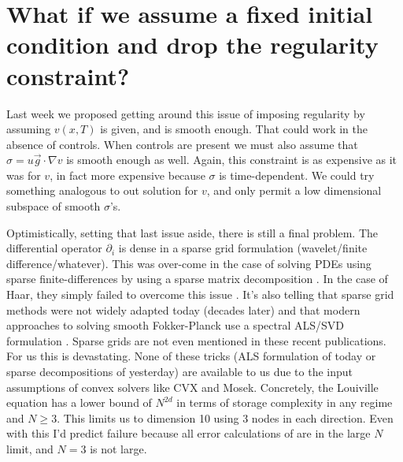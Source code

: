 \documentclass[12pt]{amsart}
\begin{document}
\section{What if we assume a fixed initial condition and drop the regularity constraint?}
Last week we proposed getting around this issue of imposing regularity by assuming $v(x,T)$ is given, and is smooth enough.
That could work in the absence of controls.
When controls are present we must also assume that $\sigma = u \vec{g} \cdot \nabla v$ is smooth enough as well.
Again, this constraint is as expensive as it was for $v$, in fact more expensive because $\sigma$ is time-dependent.
We could try something analogous to out solution for $v$, and only permit a low dimensional subspace of smooth $\sigma$'s.

Optimistically, setting that last issue aside, there is still a final problem.
The differential operator $\partial_i$ is dense in a sparse grid formulation (wavelet/finite difference/whatever).
This was over-come in the case of solving PDEs using sparse finite-differences by using a sparse matrix decomposition \cite[see page 4]{schiekofer1998software}.
In the case of Haar, they simply failed to overcome this issue \cite{koltai2011thesis}.
It's also telling that sparse grid methods were not widely adapted today (decades later) and that modern approaches to solving smooth Fokker-Planck use a spectral ALS/SVD formulation \cite{Sun20141960,Leonenko2015296}.
Sparse grids are not even mentioned in these recent publications.
For us this is devastating. None of these tricks (ALS formulation of today or sparse decompositions of yesterday) are available to us due to the input assumptions of convex solvers like CVX and Mosek.
Concretely, the Louiville equation has a lower bound of $N^{2d}$ in terms of storage complexity in any regime and $N \geq 3$.
This limits us to dimension 10 using 3 nodes in each direction.
Even with this I'd predict failure because all error calculations of \cite{BungartzGriebel2004} are in the large $N$ limit, and $N=3$ is not large.



\end{document}
